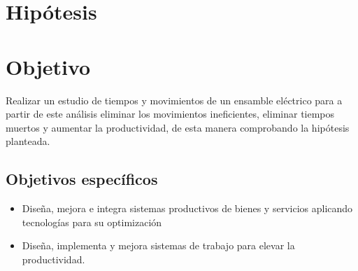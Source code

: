     \section{Hipótesis}
    
    
    \section{Objetivo}
    
    Realizar un estudio de tiempos y movimientos de un ensamble eléctrico para a partir de este análisis eliminar los movimientos ineficientes, eliminar tiempos muertos y aumentar la productividad, de esta manera comprobando la hipótesis planteada.
    
    
    \subsection{Objetivos específicos }
    
    \begin{itemize}
        \item Diseña, mejora e integra sistemas productivos de bienes y servicios aplicando tecnologías para su optimización
        \item Diseña, implementa y mejora sistemas de trabajo para elevar la productividad.
    \end{itemize}
    
